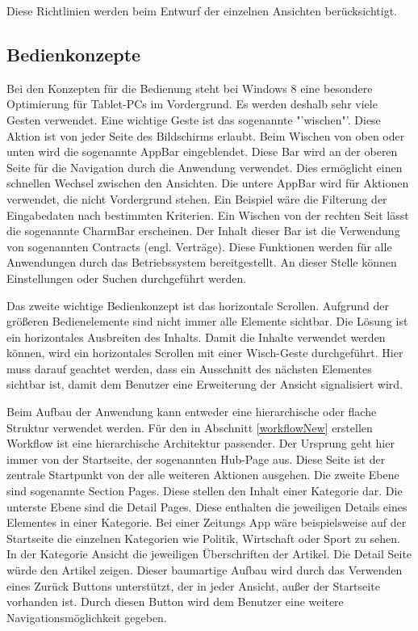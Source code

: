 Diese Richtlinien werden beim Entwurf der einzelnen Ansichten berücksichtigt. 


\subsection{Bedienkonzepte}\label{usingConcepts}
Bei den Konzepten für die Bedienung steht bei Windows 8 eine besondere Optimierung für Tablet-PCs im Vordergrund. Es werden deshalb sehr viele Gesten verwendet. Eine wichtige Geste ist das sogenannte "'wischen"'. Diese Aktion ist von jeder Seite des Bildschirms erlaubt. Beim Wischen von oben oder unten wird die sogenannte AppBar eingeblendet. Diese Bar wird an der oberen Seite für die Navigation durch die Anwendung verwendet. Dies ermöglicht einen schnellen Wechsel zwischen den Ansichten. Die untere AppBar wird für Aktionen verwendet, die nicht Vordergrund stehen. Ein Beispiel wäre die Filterung der Eingabedaten nach bestimmten Kriterien. Ein Wischen von der rechten Seit lässt die sogenannte CharmBar erscheinen. Der Inhalt dieser Bar ist die Verwendung von sogenannten Contracts (engl. Verträge). Diese Funktionen werden für alle Anwendungen durch das Betriebssystem bereitgestellt. An dieser Stelle können Einstellungen oder Suchen durchgeführt werden. \par 

Das zweite wichtige Bedienkonzept ist das horizontale Scrollen. Aufgrund der größeren Bedienelemente sind nicht immer alle Elemente sichtbar. Die Lösung ist ein horizontales Ausbreiten des Inhalts. Damit die Inhalte verwendet werden können, wird ein horizontales Scrollen mit einer Wisch-Geste durchgeführt. Hier muss darauf geachtet werden, dass ein Ausschnitt des nächsten Elementes sichtbar ist, damit dem Benutzer eine Erweiterung der Ansicht signalisiert wird. \par 

Beim Aufbau der Anwendung kann entweder eine hierarchische oder  flache Struktur verwendet werden. Für den in Abschnitt \ref{workflowNew} erstellen Workflow ist eine hierarchische Architektur passender. Der Ursprung geht hier immer von der Startseite, der sogenannten Hub-Page aus. Diese Seite ist der zentrale Startpunkt von der alle weiteren Aktionen ausgehen. Die zweite Ebene sind sogenannte Section Pages. Diese stellen den Inhalt einer  Kategorie dar. Die unterste Ebene sind die Detail Pages. Diese enthalten die jeweiligen Details eines Elementes in einer Kategorie. Bei einer Zeitungs App wäre beispielsweise auf der Startseite die einzelnen Kategorien wie Politik, Wirtschaft oder Sport zu sehen. In der Kategorie Ansicht die jeweiligen Überschriften der Artikel. Die Detail Seite würde den Artikel zeigen. Dieser baumartige Aufbau wird durch das Verwenden eines Zurück Buttons unterstützt, der in jeder Ansicht, außer der Startseite vorhanden ist. Durch diesen Button wird dem Benutzer eine weitere Navigationsmöglichkeit gegeben.

